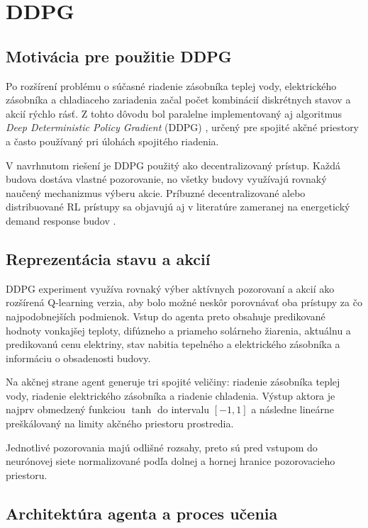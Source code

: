 \documentclass[conference]{IEEEtran}
\begin{document}
\section{DDPG}

\subsection{Motivácia pre použitie DDPG}

Po rozšírení problému o súčasné riadenie zásobníka teplej vody, elektrického zásobníka a chladiaceho zariadenia začal počet kombinácií diskrétnych stavov a akcií rýchlo rásť. Z tohto dôvodu bol paralelne implementovaný aj algoritmus \textit{Deep Deterministic Policy Gradient} (DDPG) \cite{b14}, určený pre spojité akčné priestory a často používaný pri úlohách spojitého riadenia.

V navrhnutom riešení je DDPG použitý ako decentralizovaný prístup. Každá budova dostáva vlastné pozorovanie, no všetky budovy využívajú rovnaký naučený mechanizmus výberu akcie. Príbuzné decentralizované alebo distribuované RL prístupy sa objavujú aj v literatúre zameranej na energetický demand response budov \cite{b21,b22}.

\subsection{Reprezentácia stavu a akcií}

DDPG experiment využíva rovnaký výber aktívnych pozorovaní a akcií ako rozšírená Q-learning verzia, aby bolo možné neskôr porovnávať oba prístupy za čo najpodobnejších podmienok. Vstup do agenta preto obsahuje predikované hodnoty vonkajšej teploty, difúzneho a priameho solárneho žiarenia, aktuálnu a predikovanú cenu elektriny, stav nabitia tepelného a elektrického zásobníka a informáciu o obsadenosti budovy.

Na akčnej strane agent generuje tri spojité veličiny: riadenie zásobníka teplej vody, riadenie elektrického zásobníka a riadenie chladenia. Výstup aktora je najprv obmedzený funkciou $\tanh$ do intervalu $[-1,1]$ a následne lineárne preškálovaný na limity akčného priestoru prostredia.

Jednotlivé pozorovania majú odlišné rozsahy, preto sú pred vstupom do neurónovej siete normalizované podľa dolnej a hornej hranice pozorovacieho priestoru.

\subsection{Architektúra agenta a proces učenia}
\end{document}
